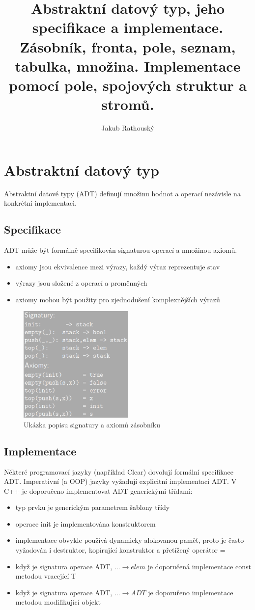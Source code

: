 \documentclass{szzclass}
\title{Abstraktní datový typ, jeho specifikace a implementace. Zásobník, fronta, pole, seznam, tabulka, množina. Implementace pomocí pole, spojových struktur a stromů.}
\author{Jakub Rathouský}
\begin{document}
\maketitle
\tableofcontents
\newpage

\section{Abstraktní datový typ}
Abstraktní datové typy (ADT) definují množinu hodnot a operací nezávisle na konkrétní implementaci.
\subsection{Specifikace}
ADT může být formálně specifikován signaturou operací a množinou axiomů.
\begin{itemize}
    \item axiomy jsou ekvivalence mezi výrazy, každý výraz reprezentuje stav
    \item výrazy jsou složené z operací a proměnných
    \item axiomy mohou být použity pro zjednodušení komplexnějších výrazů
\end{itemize}
\begin{figure}[h!]
    \centering
    \includegraphics[width=0.5\textwidth]{topics/bi-spol-22/images/ADT_signature_axiom.png}
    \caption{Ukázka popisu signatury a axiomů zásobníku}
    \label{ADT_SIGNATURE_AXIOM}
\end{figure}
\subsection{Implementace}
Některé programovací jazyky (například Clear) dovolují formální specifikace ADT. Imperativní (a OOP) jazyky
vyžadují explicitní implementaci ADT. V C++ je doporučeno implementovat ADT generickými třídami:
\begin{itemize}
    \item typ prvku je generickým parametrem šablony třídy
    \item operace init je implementována konstruktorem
    \item implementace obvykle používá dynamicky alokovanou paměť, proto je často vyžadován i destruktor, kopírující konstruktor a přetížený operátor =
    \item když je signatura operace ADT, $\dots \rightarrow elem$ je doporučená implementace const metodou vracející T
    \item když je signatura operace ADT, $\dots \rightarrow ADT$ je doporuřeno implementace metodou modifikující objekt
\end{itemize}
\end{document}
